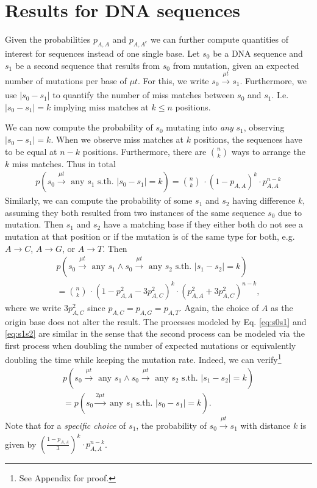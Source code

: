 \documentclass[12pt]{article}
\begin{document}
\section{Results for DNA sequences}
Given the probabilities $p_{A,A}$ and $p_{A,A^c}$ we can further compute quantities of interest for sequences instead of one single base. 
Let $s_0$ be a DNA sequence and $s_1$ be a second sequence that results from $s_0$ from mutation, given an expected number of mutations per base of $\mu t$. For this, we write $s_0\xrightarrow[]{\mu t} s_1$. Furthermore, we use $|s_0 -s_1|$ to quantify the number of miss matches between $s_0$ and $s_1$. I.e. $|s_0-s_1|=k$ implying miss matches at $k\leq n$ positions.

We can now compute the probability of $s_0$ mutating into \textit{any} $s_1$, observing $|s_0-s_1|=k$. When we observe miss matches at $k$ positions, the sequences have to be equal at $n-k$ positions. Furthermore, there are $\binom{n}{k}$ ways to arrange the $k$ miss matches. Thus in total
\begin{align}
	p(s_0 \xrightarrow[]{\mu t} \text{ any } s_1 \text{ s.th. } |s_0-s_1|=k) =\binom{n}{k} \, \cdot  \left(1-p_{A,A}\right)^{k}\cdot p_{A,A}^{n-k} \label{eq:s0s1}
\end{align}
Similarly, we can compute the probability of some $s_1$ and $s_2$ having difference $k$, assuming they both resulted from two instances of the same sequence $s_0$ due to mutation. Then $s_1$ and $s_2$ have a matching base if they either both do not see a mutation at that position or if the mutation is of the same type for both, e.g. $A\rightarrow C$, $A\rightarrow G$, or $A\rightarrow T$. Then
\begin{align}
p(s_0 \xrightarrow[]{\mu t} \text{ any } s_1  \wedge s_0 \xrightarrow[]{\mu t} \text{ any } s_2  \text{ s.th. } |s_1-s_2|=k) \nonumber \\
 = \binom{n}{k} \, \cdot \left(1-p_{A,A}^2 -3p_{A,C}^2\right)^{k}\cdot \left(p_{A,A}^2 +3p_{A,C}^2\right)^{n-k},\label{eq:s1s2}
\end{align}
where we write $3p_{A,C}^2$ since $p_{A,C} = p_{A,G}=p_{A,T}$. Again, the choice of $A$ as the origin base does not alter the result. The processes modeled by Eq. \eqref{eq:s0s1} and \eqref{eq:s1s2} are similar in the sense that the second process can be modeled via the first process when doubling the number of expected mutations or equivalently doubling the time while keeping the mutation rate. Indeed, we can verify\footnote{See Appendix for proof.}
\begin{align}
p(s_0 \xrightarrow[]{\mu t} \text{ any } s_1  \wedge s_0 \xrightarrow[]{\mu t}\text{ any } s_2  \text{ s.th. } |s_1-s_2|=k) \nonumber \\ 
= p(s_0 \xrightarrow[]{2 \mu t} \text{ any } s_1 \text{ s.th. } |s_0-s_1|=k).
\label{eq:s1s2equivelence}
\end{align}
Note that for a \textit{specific choice} of $s_1$, the probability of $s_0 \xrightarrow[]{\mu t} s_1$ with distance $k$ is given by $\left(\frac{1-p_{A,A}}{3}\right)^k \cdot p_{A,A}^{n-k}$.
\end{document}
